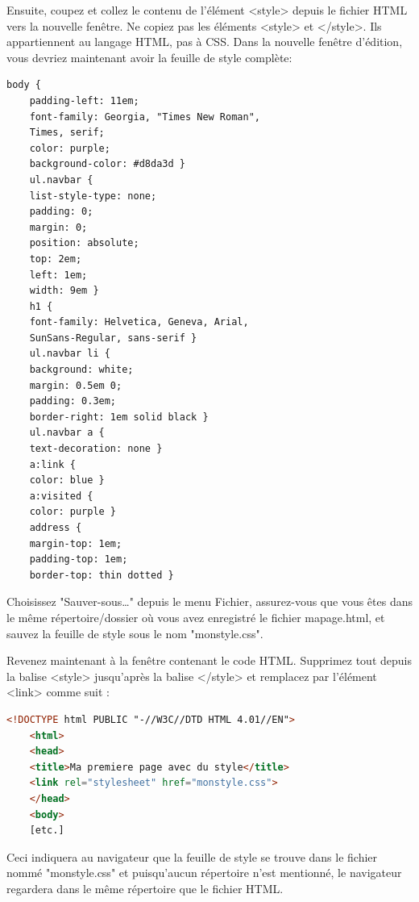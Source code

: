 Ensuite, coupez et collez le contenu de l'élément <style> depuis le fichier HTML vers la nouvelle fenêtre. Ne copiez pas les éléments <style> et </style>. Ils appartiennent au langage HTML, pas à CSS. Dans la nouvelle fenêtre d'édition, vous devriez maintenant avoir la feuille de style complète: 
\begin{lstlisting}[language=html]
	body {
	padding-left: 11em;
	font-family: Georgia, "Times New Roman",
	Times, serif;
	color: purple;
	background-color: #d8da3d }
	ul.navbar {
	list-style-type: none;
	padding: 0;
	margin: 0;
	position: absolute;
	top: 2em;
	left: 1em;
	width: 9em }
	h1 {
	font-family: Helvetica, Geneva, Arial,
	SunSans-Regular, sans-serif }
	ul.navbar li {
	background: white;
	margin: 0.5em 0;
	padding: 0.3em;
	border-right: 1em solid black }
	ul.navbar a {
	text-decoration: none }
	a:link {
	color: blue }
	a:visited {
	color: purple }
	address {
	margin-top: 1em;
	padding-top: 1em;
	border-top: thin dotted }
\end{lstlisting}
Choisissez "Sauver-sous…" depuis le menu Fichier, assurez-vous que vous êtes dans le même répertoire/dossier où vous avez enregistré le fichier mapage.html, et sauvez la feuille de style sous le nom "monstyle.css".

Revenez maintenant à la fenêtre contenant le code HTML. Supprimez tout depuis la balise <style> jusqu'après la balise </style> et remplacez par l'élément <link> comme suit : 
\begin{lstlisting}[language=html]
	<!DOCTYPE html PUBLIC "-//W3C//DTD HTML 4.01//EN">
	<html>
	<head>
	<title>Ma premiere page avec du style</title>
	<link rel="stylesheet" href="monstyle.css">
	</head>
	<body>
	[etc.]
\end{lstlisting}


Ceci indiquera au navigateur que la feuille de style se trouve dans le fichier nommé "monstyle.css" et puisqu'aucun répertoire n'est mentionné, le navigateur regardera dans le même répertoire que le fichier HTML.

